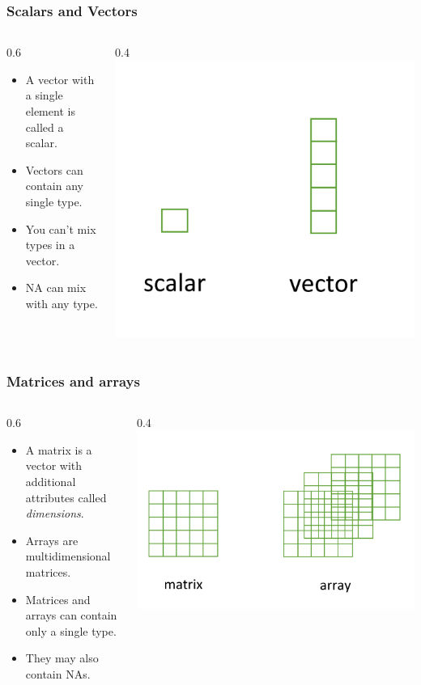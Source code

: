 \documentclass{beamer}
\newcommand{\bi}{\begin{itemize}}
\newcommand{\li}{\item}
\newcommand{\ei}{\end{itemize}}
\newcommand{\bfr}[1]{\begin{frame}[fragile]\frametitle{{ #1 }}}
\newcommand{\cola}{\begin{columns}\begin{column}{0.6\textwidth}}
\newcommand{\colb}{\end{column}\begin{column}{0.4\textwidth}}
\newcommand{\colc}{\end{column}\end{columns}}
\begin{document}
\bfr{Scalars and Vectors}

\cola
\bi
\li A vector with a single element is called a scalar.
\li Vectors can contain any single type.
\li You can't mix types in a vector.
\li NA can mix with any type.
\ei
\colb
\includegraphics[width=\textwidth]{scal_vec}
\colc
\end{frame}



\bfr{Matrices and arrays}

\cola
\bi
\li A matrix is a vector with additional attributes called {\em dimensions}.
\li Arrays are multidimensional matrices.
\li Matrices and arrays can contain only a single type.
\li They may also contain NAs.
\ei
\colb
\includegraphics[width=\textwidth]{mat_array}
\colc
\end{frame}
\end{document}
